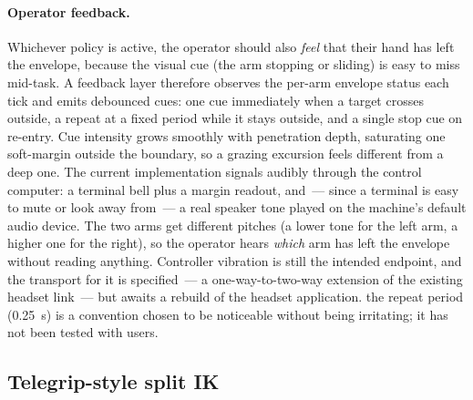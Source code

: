 \paragraph{Operator feedback.}
Whichever policy is active, the operator should also \emph{feel} that
their hand has left the envelope, because the visual cue (the arm
stopping or sliding) is easy to miss mid-task. A feedback layer
therefore observes the per-arm envelope status each tick and emits
debounced cues: one cue immediately when a target crosses outside, a
repeat at a fixed period while it stays outside, and a single stop cue
on re-entry. Cue intensity grows smoothly with penetration depth,
saturating one soft-margin outside the boundary, so a grazing excursion
feels different from a deep one. The current implementation signals
audibly through the control computer: a terminal bell plus a margin
readout, and~--- since a terminal is easy to mute or look away from~--- a
real speaker tone played on the machine's default audio device. The two
arms get different pitches (a lower tone for the left arm, a higher one
for the right), so the operator hears \emph{which} arm has left the
envelope without reading anything. Controller vibration is still the
intended endpoint, and the transport for it is specified~--- a
one-way-to-two-way extension of the existing headset link~--- but awaits
a rebuild of the headset application.
\unjustified{} the repeat period (\SI{0.25}{s}) is a convention chosen
to be noticeable without being irritating; it has not been tested with
users.

\subsection{Telegrip-style split IK}
\label{sec:telegrip}

